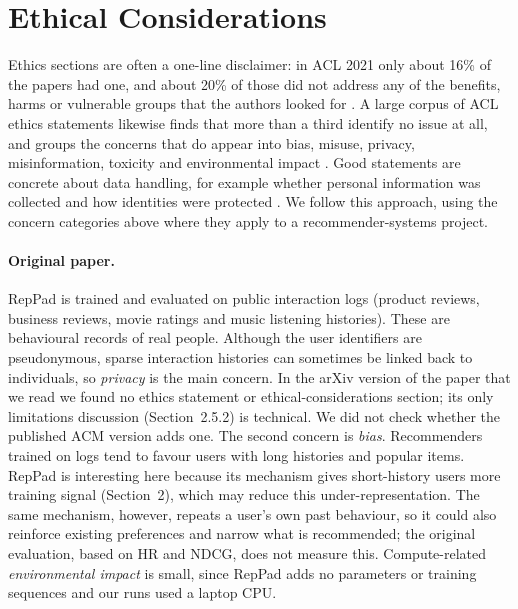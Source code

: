 \documentclass[11pt]{article}
\begin{document}
\section{Ethical Considerations}

Ethics sections are often a one-line disclaimer: in ACL 2021 only
about 16\% of the papers had one, and about 20\% of those did not address any of the
benefits, harms or vulnerable groups that the authors looked for
\citep{benotti2022ethics}. A large corpus of ACL ethics statements likewise
finds that more than a third identify no issue at all, and groups the concerns
that do appear into bias, misuse, privacy, misinformation, toxicity and
environmental impact \citep{karamolegkou2025ethicon}. Good statements are
concrete about data handling, for example whether personal information was
collected and how identities were protected \citep{pyatkin2023clarifydelphi}.
We follow this approach, using the concern categories above where they apply to
a recommender-systems project.

\paragraph{Original paper.}
RepPad is trained and evaluated on public interaction logs (product reviews,
business reviews, movie ratings and music listening histories). These are
behavioural records of real people. Although the user identifiers are pseudonymous, sparse
interaction histories can sometimes be linked back to individuals, so
\emph{privacy} is the main concern. In the arXiv version of the paper that we read we found no ethics statement or ethical-considerations section; its only limitations discussion (Section~2.5.2) is technical. We did not check whether the published ACM version adds one. The second concern is \emph{bias}.
Recommenders trained on logs tend to favour users with long histories and popular
items. RepPad is interesting here because its mechanism gives short-history users
more training signal (Section~2), which may reduce this under-representation. The
same mechanism, however, repeats a user's own past behaviour, so it could also
reinforce existing preferences and narrow what is recommended; the original
evaluation, based on HR and NDCG, does not measure this. Compute-related
\emph{environmental impact} is small, since RepPad adds no parameters or training
sequences and our runs used a laptop CPU.
\end{document}
